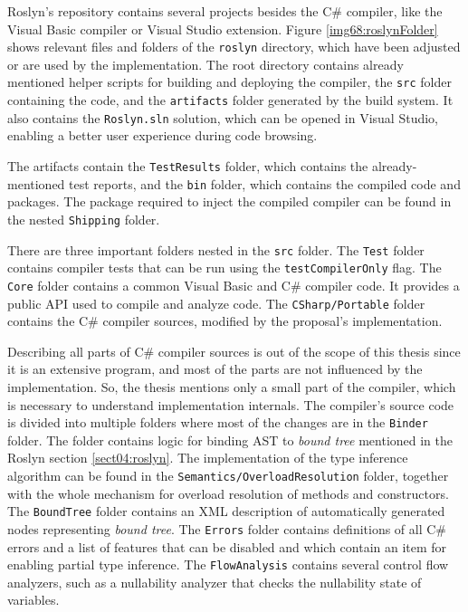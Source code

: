 Roslyn’s repository contains several projects besides the C\# compiler, like the Visual Basic compiler or Visual Studio extension. 
Figure \ref{img68:roslynFolder} shows relevant files and folders of the \texttt{roslyn} directory, which have been adjusted or are used by the implementation. 
The root directory contains already mentioned helper scripts for building and deploying the compiler, the \texttt{src} folder containing the code, and the \texttt{artifacts} folder generated by the build system.
It also contains the \texttt{Roslyn.sln} solution, which can be opened in Visual Studio, enabling a better user experience during code browsing.
\par
The artifacts contain the \texttt{TestResults} folder, which contains the already-mentioned test reports, and the \texttt{bin} folder, which contains the compiled code and packages. 
The package required to inject the compiled compiler can be found in the nested \texttt{Shipping} folder.
\par
There are three important folders nested in the \texttt{src} folder. 
The \texttt{Test} folder contains compiler tests that can be run using the \texttt{testCompilerOnly} flag. 
The \texttt{Core} folder contains a common Visual Basic and C\# compiler code. 
It provides a public API used to compile and analyze code. 
The \texttt{CSharp/Portable} folder contains the C\# compiler sources, modified by the proposal’s implementation.
\par
Describing all parts of C\# compiler sources is out of the scope of this thesis since it is an extensive program, and most of the parts are not influenced by the implementation. 
So, the thesis mentions only a small part of the compiler, which is necessary to understand implementation internals. 
The compiler’s source code is divided into multiple folders where most of the changes are in the \texttt{Binder} folder. 
The folder contains logic for binding AST to \textit{bound tree} mentioned in the Roslyn section \ref{sect04:roslyn}. 
The implementation of the type inference algorithm can be found in the \texttt{Semantics/OverloadResolution} folder, together with the whole mechanism for overload resolution of methods and constructors. 
The \texttt{BoundTree} folder contains an XML description of automatically generated nodes representing \textit{bound tree}. 
The \texttt{Errors} folder contains definitions of all C\# errors and a list of features that can be disabled and which contain an item for enabling partial type inference. 
The \texttt{FlowAnalysis} contains several control flow analyzers, such as a nullability analyzer that checks the nullability state of variables. 
